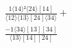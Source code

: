 \documentclass[varwidth, border=5pt]{standalone}
\begin{document}
\begin{my}
$\begin{gathered}
\scriptscriptstyle\frac{1⟨14⟩²⟨24⟩[14]}{⟨12⟩⟨13⟩[24]⟨34⟩} +\\
\scriptscriptstyle\frac{-1⟨34⟩[13][34]}{⟨13⟩[14][24]} \phantom{+}
\end{gathered}$
\end{my}
\end{document}
